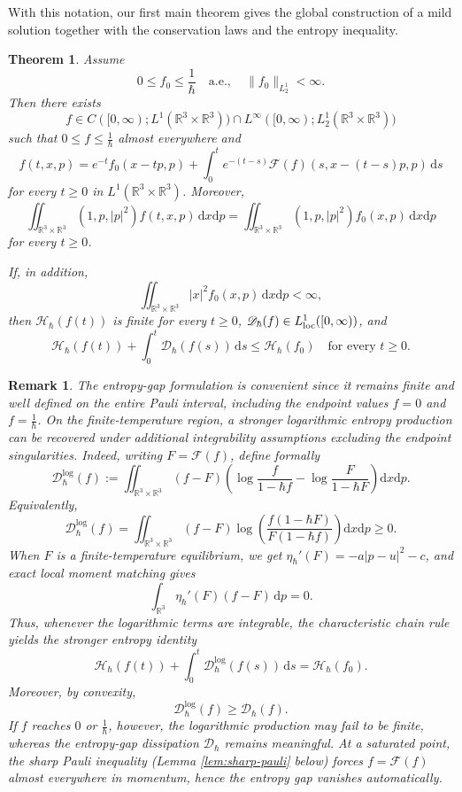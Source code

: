 \documentclass[10pt,reqno]{amsart}
\numberwithin{equation}{section}
\newtheorem{theorem}{Theorem}[section]
\newtheorem{remark}{Remark}[section]
\theoremstyle{definition}
\newcommand{\R}{\mathbb R}
\newcommand{\dx}{\mathrm{d}x}
\newcommand{\dpp}{\mathrm{d}p}
\newcommand{\ds}{\mathrm{d}s}
\newcommand{\calF}{\mathcal F}
\newcommand{\bq}{\begin{equation}}
\newcommand{\eq}{\end{equation}}
\newcommand{\lt}{\left}
\newcommand{\rt}{\right}
\begin{document}
With this notation, our first main theorem gives the global construction of a mild solution together with the conservation laws and the entropy inequality.

\begin{theorem}\label{thm:main}
Assume
\bq \label{eq:ini}
 0\leq f_0\leq\frac1\hbar \quad\text{a.e.},  \quad  \|f_0\|_{L^1_2}<\infty.
\eq
Then there exists
\[
 f\in C([0,\infty);L^1(\R^3\times\R^3)) \cap L^\infty([0,\infty);L^1_2(\R^3\times\R^3))
\]
such that $0\leq f\leq\frac1\hbar $ almost everywhere and
\bq \label{eq:mild-main}
 f(t,x,p) =e^{-t}f_0(x-tp,p) +\int_0^t e^{-(t-s)} \calF(f)(s,x-(t-s)p,p)\,\ds
\eq
for every $t\geq0$ in $L^1(\R^3\times\R^3)$.  Moreover,
\[
 \iint_{\R^3\times\R^3}  (1,p,|p|^2)f(t,x,p)\,\dx\dpp  =  \iint_{\R^3\times\R^3}  (1,p,|p|^2)f_0(x,p)\,\dx\dpp
\]
for every $t\geq0$.

If, in addition,
\[
 \iint_{\R^3\times\R^3}  |x|^2f_0(x,p)\,\dx\dpp<\infty,
\]
then $\mathscr H_\hbar(f(t))$ is finite for every $t\geq0$, $\mathscr D_\hbar(f)\in L^1_{\rm loc}([0,\infty))$, and
\bq\label{eq:H-thm-gap}
 \mathscr H_\hbar(f(t))  +  \int_0^t\mathscr D_\hbar(f(s))\,\ds  \leq  \mathscr H_\hbar(f_0)  \quad\text{for every }t\geq0.
\eq
\end{theorem}

\begin{remark}
The entropy-gap formulation is convenient since it remains finite and well defined on the entire Pauli interval, including the endpoint values $f=0$ and $f=\frac1\hbar $.  On the finite-temperature region, a stronger logarithmic entropy production can be recovered under additional integrability assumptions excluding the endpoint singularities.  Indeed, writing $F=\calF(f)$, define formally
\[
 \mathscr D_\hbar^{\log}(f)  :=  \iint_{\R^3 \times \R^3}  (f-F)  \lt(  \log\frac{f}{1-\hbar f}  -  \log\frac{F}{1-\hbar F}  \rt) \dx\dpp .
\]
Equivalently,
\[
 \mathscr D_\hbar^{\log}(f) = \iint_{\R^3 \times \R^3}  (f-F)  \log\lt(  \frac{f(1-\hbar F)}{F(1-\hbar f)}  \rt) \dx\dpp
 \ge0.
\]
When $F$ is a finite-temperature equilibrium, we get $\eta_\hbar'(F)  =  -a|p-u|^2-c$, and exact local moment matching gives
\[
 \int_{\R^3} \eta_\hbar'(F)(f-F)\,\dpp=0.
\]
Thus, whenever the logarithmic terms are integrable, the characteristic chain rule yields the stronger entropy identity
\[
\mathscr H_\hbar(f(t))  +  \int_0^t\mathscr D_\hbar^{\log}(f(s))\,\ds  =  \mathscr H_\hbar(f_0).
\]
Moreover, by convexity,
\[
 \mathscr D_\hbar^{\log}(f)\ge  \mathscr D_\hbar(f).
\]
If $f$ reaches $0$ or $\frac1\hbar $, however, the logarithmic production may fail to be finite, whereas the entropy-gap dissipation $\mathscr D_\hbar$ remains meaningful.  At a saturated point, the sharp Pauli inequality (Lemma \ref{lem:sharp-pauli} below) forces $f=\calF(f)$ almost everywhere in momentum, hence the entropy gap vanishes automatically.
\end{remark}
 
\end{document}
